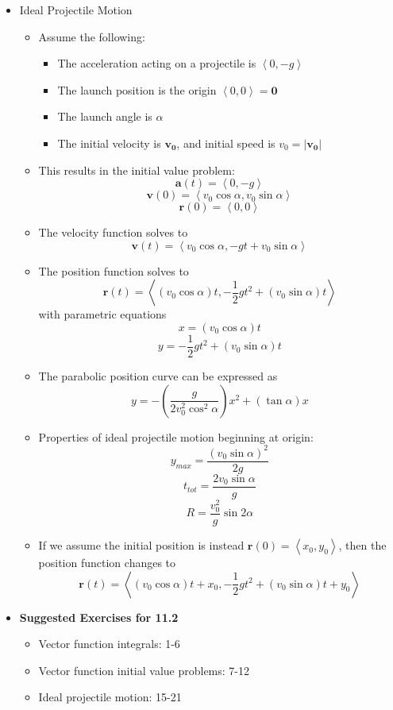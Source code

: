 \documentclass[12pt]{article}
\renewcommand{\vec}[1]{\mathbf{#1}}
\newcommand{\<}{\left<}
\renewcommand{\>}{\right>}
\begin{document}
\begin{itemize}
    \item Ideal Projectile Motion 
      \begin{itemize}
      \item Assume the following:
        \begin{itemize}
          \item The acceleration acting on a projectile is $\<0,-g\>$
          \item The launch position is the origin $\<0,0\>=\vec{0}$
          \item The launch angle is $\alpha$
          \item The initial velocity is $\vec{v_0}$, and initial speed is $v_0=|\vec{v_0}|$
        \end{itemize}
      \item This results in the initial value problem:
        \[\vec{a}(t) = \<0,-g\>\]
        \[\vec{v}(0) = \<v_0\cos\alpha,v_0\sin\alpha\>\]
        \[\vec{r}(0) = \<0,0\> \]
      \item The velocity function solves to \[\vec{v}(t) = \<v_0\cos\alpha,-gt+v_0\sin\alpha\>\]
      \item The position function solves to 
        \[\vec{r}(t) = \<(v_0\cos\alpha)t,-\frac{1}{2}gt^2+(v_0\sin\alpha)t\>\]
        with parametric equations 
        \[x=(v_0\cos\alpha)t\] \[y=-\frac{1}{2}gt^2+(v_0\sin\alpha)t\]
      \item The parabolic position curve can be expressed as \[y = -\left(\frac{g}{2v_0^2\cos^2\alpha}\right)x^2+(\tan\alpha)x\]
      \item Properties of ideal projectile motion beginning at origin:
        \[y_{max} = \frac{(v_0\sin\alpha)^2}{2g}\]
        \[t_{tot} = \frac{2v_0\sin\alpha}{g}\]
        \[R = \frac{v_0^2}{g}\sin2\alpha\]
      \item If we assume the initial position is instead $\vec{r}(0)=\<x_0,y_0\>$, then the position function changes to \[\vec{r}(t)=\<(v_0\cos\alpha)t+x_0,-\frac{1}{2}gt^2+(v_0\sin\alpha)t+y_0\>\]
      \end{itemize}
    \item \textbf{Suggested Exercises for 11.2}
      \begin{itemize}
      \item Vector function integrals: 1-6
      \item Vector function initial value problems: 7-12
      \item Ideal projectile motion: 15-21
      \end{itemize}
  \end{itemize}
\end{document}
